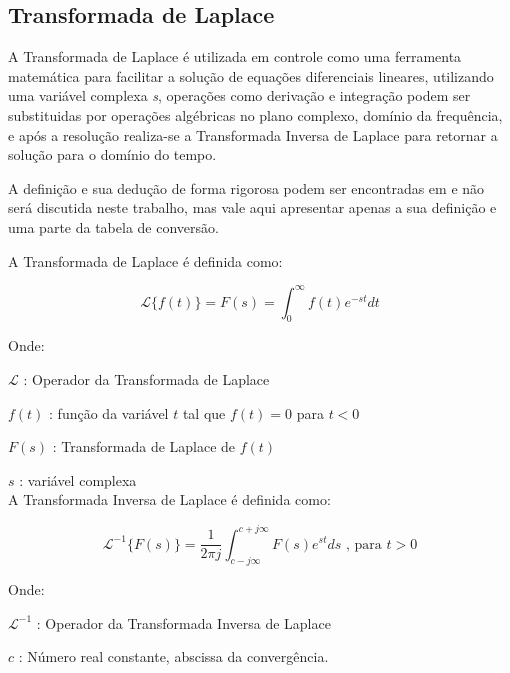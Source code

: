 \subsection{Transformada de Laplace}
 
A Transformada de Laplace é utilizada em controle como uma ferramenta matemática para facilitar a solução de equações diferenciais lineares, utilizando uma variável complexa \emph{s}, operações como derivação e integração podem ser substituidas por operações algébricas no plano complexo, domínio da frequência, e após a resolução realiza-se a Transformada Inversa de Laplace para retornar a solução para o domínio do tempo.

A definição e sua dedução de forma rigorosa podem ser encontradas em \cite{Ogata} e não será discutida neste trabalho, mas vale aqui apresentar apenas a sua definição e uma parte da tabela de conversão.

A Transformada de Laplace é definida como:

\begin{equation}
\mathscr{L}\{f(t)\} = F(s) = \int_{0}^{\infty} f(t) e^{-st} dt
\label{eq:transfLaplace}
\end{equation} 

Onde:

\setlength{\parindent}{2cm}
$\mathscr{L}$ : Operador da Transformada de Laplace 

$f(t)$ : função da variável $t$ tal que $f(t) = 0$ para $t < 0$ 

$F(s)$ : Transformada de Laplace de $f(t)$

$s$ : variável complexa
\\

\setlength{\parindent}{0cm}
A Transformada Inversa de Laplace é definida como:

\begin{equation}
\mathscr{L}^{-1} \{F(s)\} =  \frac{1}{2 \pi j} \int_{c-j\infty}^{c+j\infty}F(s) e^{st} ds  \text{ , para } t > 0
\label{eq:transfInvLaplace}
\end{equation}

Onde:

\setlength{\parindent}{2cm}
$\mathscr{L}^{-1}$ : Operador da Transformada Inversa de Laplace

$c$ : Número real constante, abscissa da convergência.

\setlength{\parindent}{1cm}

